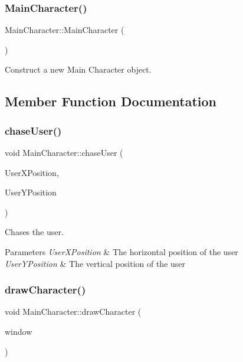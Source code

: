 \subsubsection{\texorpdfstring{MainCharacter()}{MainCharacter()}}
{\footnotesize\ttfamily Main\+Character\+::\+Main\+Character (\begin{DoxyParamCaption}{ }\end{DoxyParamCaption})}



Construct a new Main Character object. 



\subsection{Member Function Documentation}
\mbox{\label{classMainCharacter_aeb9d4174780f4cdc1901e9d0597b6da8}} 
\subsubsection{\texorpdfstring{chaseUser()}{chaseUser()}}
{\footnotesize\ttfamily void Main\+Character\+::chase\+User (\begin{DoxyParamCaption}\item[{float}]{User\+X\+Position,  }\item[{float}]{User\+Y\+Position }\end{DoxyParamCaption})}



Chases the user. 


\begin{DoxyParams}{Parameters}
{\em User\+X\+Position} & The horizontal position of the user\\
\hline
{\em User\+Y\+Position} & The vertical position of the user \\
\hline
\end{DoxyParams}
\mbox{\label{classMainCharacter_a88c571025d325e44d349a1e899e8b22a}} 
\subsubsection{\texorpdfstring{drawCharacter()}{drawCharacter()}}
{\footnotesize\ttfamily void Main\+Character\+::draw\+Character (\begin{DoxyParamCaption}\item[{sf\+::\+Render\+Window \&}]{window }\end{DoxyParamCaption})}



